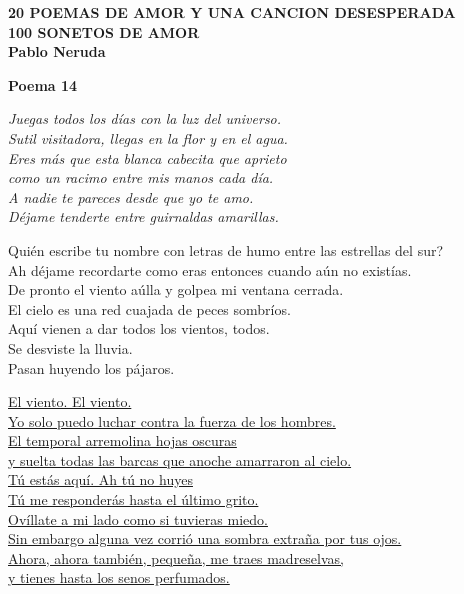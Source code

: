 \begin{center}
\textbf{    20 POEMAS DE AMOR Y UNA CANCION DESESPERADA \\
100 SONETOS DE AMOR \\
Pablo Neruda }
\end{center}

\begin{flushleft}
\textbf{    Poema 14 }
\end{flushleft}
\textit{Juegas todos los días con la luz del universo. \\
Sutil visitadora, llegas en la flor y en el agua. \\
Eres más que esta blanca cabecita que aprieto \\
como un racimo entre mis manos cada día. \\
A nadie te pareces desde que yo te amo. \\
Déjame tenderte entre guirnaldas amarillas.\\} 
\begin{center}
    Quién escribe tu nombre con letras de humo entre las estrellas del sur?\\ 
Ah déjame recordarte como eras entonces cuando aún no existías. \\
De pronto el viento aúlla y golpea mi ventana cerrada. \\
El cielo es una red cuajada de peces sombríos. \\
Aquí vienen a dar todos los vientos, todos. \\
Se desviste la lluvia. \\
Pasan huyendo los pájaros.\\
   \end{center} 
\underline{El viento. El viento. } \\ \underline{
Yo solo puedo luchar contra la fuerza de los hombres. } \\ \underline{
El temporal arremolina hojas oscuras } \\ \underline{
y suelta todas las barcas que anoche amarraron al cielo. } \\ \underline{
Tú estás aquí. Ah tú no huyes } \\ \underline{
Tú me responderás hasta el último grito. } \\ \underline{
Ovíllate a mi lado como si tuvieras miedo. } \\ \underline{
Sin embargo alguna vez corrió una sombra extraña por tus ojos. } \\ \underline{
Ahora, ahora también, pequeña, me traes madreselvas, } \\ \underline{
y tienes hasta los senos perfumados.} \\
